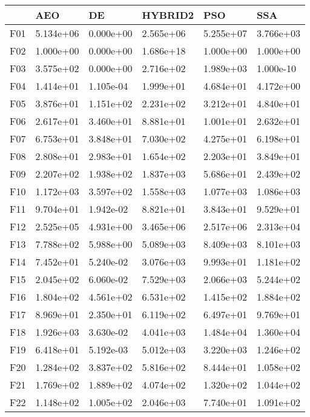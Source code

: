 \begin{tabular}{llllll}
\toprule
{} &        AEO &         DE &    HYBRID2 &        PSO &        SSA \\
\midrule
F01  &  5.134e+06 &  0.000e+00 &  2.565e+06 &  5.255e+07 &  3.766e+03 \\
F02  &  1.000e+00 &  0.000e+00 &  1.686e+18 &  1.000e+00 &  1.000e+00 \\
F03  &  3.575e+02 &  0.000e+00 &  2.716e+02 &  1.989e+03 &  1.000e-10 \\
F04  &  1.414e+01 &  1.105e-04 &  1.999e+01 &  4.684e+01 &  4.172e+00 \\
F05  &  3.876e+01 &  1.151e+02 &  2.231e+02 &  3.212e+01 &  4.840e+01 \\
F06  &  2.617e+01 &  3.460e+01 &  8.881e+01 &  1.001e+01 &  2.632e+01 \\
F07  &  6.753e+01 &  3.848e+01 &  7.030e+02 &  4.275e+01 &  6.198e+01 \\
F08  &  2.808e+01 &  2.983e+01 &  1.654e+02 &  2.203e+01 &  3.849e+01 \\
F09  &  2.207e+02 &  1.938e+02 &  1.837e+03 &  5.686e+01 &  2.439e+02 \\
F10  &  1.172e+03 &  3.597e+02 &  1.558e+03 &  1.077e+03 &  1.086e+03 \\
F11  &  9.704e+01 &  1.942e-02 &  8.821e+01 &  3.843e+01 &  9.529e+01 \\
F12  &  2.525e+05 &  4.931e+00 &  3.465e+06 &  2.517e+06 &  2.313e+04 \\
F13  &  7.788e+02 &  5.988e+00 &  5.089e+03 &  8.409e+03 &  8.101e+03 \\
F14  &  7.452e+01 &  5.240e-02 &  3.076e+03 &  9.993e+01 &  1.181e+02 \\
F15  &  2.045e+02 &  6.060e-02 &  7.529e+03 &  2.066e+03 &  5.244e+02 \\
F16  &  1.804e+02 &  4.561e+02 &  6.531e+02 &  1.415e+02 &  1.884e+02 \\
F17  &  8.969e+01 &  2.350e+01 &  6.119e+02 &  6.497e+01 &  9.769e+01 \\
F18  &  1.926e+03 &  3.630e-02 &  4.041e+03 &  1.484e+04 &  1.360e+04 \\
F19  &  6.418e+01 &  5.192e-03 &  5.012e+03 &  3.220e+03 &  1.246e+02 \\
F20  &  1.284e+02 &  3.837e+02 &  5.816e+02 &  8.444e+01 &  1.058e+02 \\
F21  &  1.769e+02 &  1.889e+02 &  4.074e+02 &  1.320e+02 &  1.044e+02 \\
F22  &  1.148e+02 &  1.005e+02 &  2.046e+03 &  7.740e+01 &  1.091e+02 \\

\end{tabular}
